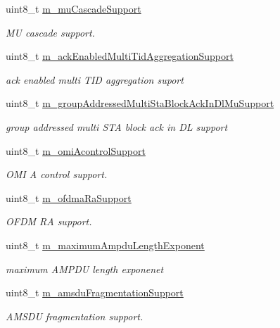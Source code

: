 \begin{DoxyCompactItemize}
uint8\+\_\+t \hyperlink{classns3_1_1HeCapabilities_a5a314c610b7489063772e07769ff9562}{m\+\_\+mu\+Cascade\+Support}
\begin{DoxyCompactList}\small\item\em MU cascade support. \end{DoxyCompactList}\item 
uint8\+\_\+t \hyperlink{classns3_1_1HeCapabilities_a483ff6eafe4090c371f997f3b3d00533}{m\+\_\+ack\+Enabled\+Multi\+Tid\+Aggregation\+Support}
\begin{DoxyCompactList}\small\item\em ack enabled multi T\+ID aggregation suport \end{DoxyCompactList}\item 
uint8\+\_\+t \hyperlink{classns3_1_1HeCapabilities_a8ea8d23d3e28711cd82d32cfd2723f7a}{m\+\_\+group\+Addressed\+Multi\+Sta\+Block\+Ack\+In\+Dl\+Mu\+Support}
\begin{DoxyCompactList}\small\item\em group addressed multi S\+TA block ack in DL support \end{DoxyCompactList}\item 
uint8\+\_\+t \hyperlink{classns3_1_1HeCapabilities_a298a39ff42fc92cdb7eabf4dc93212f1}{m\+\_\+omi\+Acontrol\+Support}
\begin{DoxyCompactList}\small\item\em O\+MI A control support. \end{DoxyCompactList}\item 
uint8\+\_\+t \hyperlink{classns3_1_1HeCapabilities_a5ea71c2d79607f3708c739af0c03fde7}{m\+\_\+ofdma\+Ra\+Support}
\begin{DoxyCompactList}\small\item\em O\+F\+DM RA support. \end{DoxyCompactList}\item 
uint8\+\_\+t \hyperlink{classns3_1_1HeCapabilities_a720c53d4f149e5b47945c9e9b5882090}{m\+\_\+maximum\+Ampdu\+Length\+Exponent}
\begin{DoxyCompactList}\small\item\em maximum A\+M\+P\+DU length exponenet \end{DoxyCompactList}\item 
uint8\+\_\+t \hyperlink{classns3_1_1HeCapabilities_a192e30696e51c3408feae147c8b180cb}{m\+\_\+amsdu\+Fragmentation\+Support}
\begin{DoxyCompactList}\small\item\em A\+M\+S\+DU fragmentation support. \end{DoxyCompactList}\item 

\end{DoxyCompactItemize}
